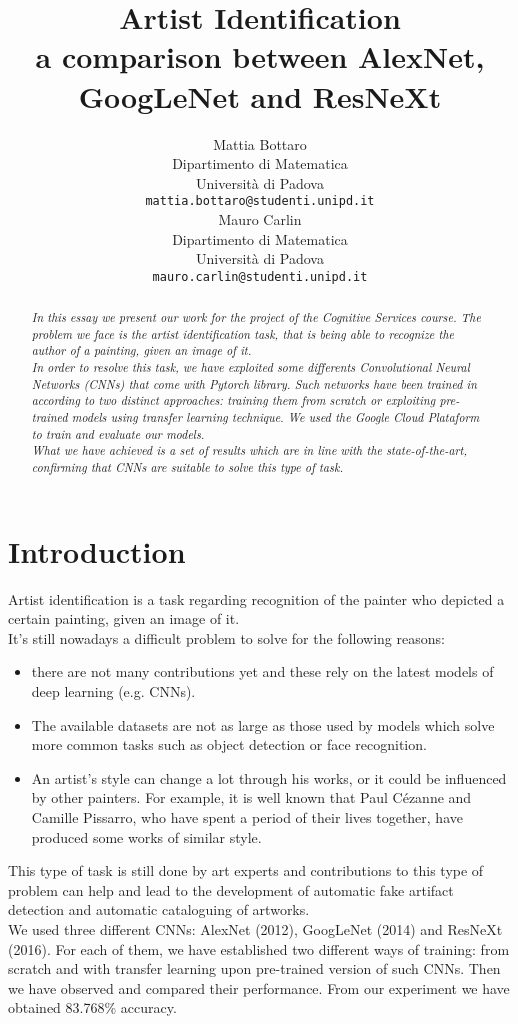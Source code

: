 \documentclass{article}
\title{Artist Identification	\\  a comparison between AlexNet, GoogLeNet and ResNeXt}
\author{
  Mattia Bottaro \\
  Dipartimento  di Matematica\\
  Università di Padova \\
  \texttt{mattia.bottaro@studenti.unipd.it} \\
   \And
  Mauro Carlin \\
Dipartimento  di Matematica\\
Università di Padova \\
\texttt{mauro.carlin@studenti.unipd.it} \\
}
\begin{document}
\maketitle

\begin{abstract}
	\textit{In this essay we present our work for the project of the Cognitive Services course.
	The problem we face is the artist identification task, that is being able to recognize the author of a painting, given an image of it.\\
	In order to resolve this task, we have exploited some differents Convolutional Neural Networks (CNNs) that come with \textit{Pytorch} library. Such networks have been trained in according to two distinct approaches: training them from scratch or exploiting pre-trained models using transfer learning technique. We used the \textit{Google Cloud Plataform} to train and evaluate our models.\\
	What we have achieved is a set of results which are in line with the  state-of-the-art, confirming that CNNs are suitable to solve this type of task.}
\end{abstract}




\section{Introduction}
Artist identification is a task regarding recognition of the painter who depicted a certain painting, given an image of it.\\
It's still nowadays a difficult problem to solve for the following reasons:
\begin{itemize}
	\item there are not many contributions yet and these rely on the latest models of deep learning (e.g. CNNs). 
	\item The available datasets are not as large as those used by models which solve more common tasks such as object detection or face recognition.
	\item An artist's style can change a lot through his works, or it could be influenced by other painters. For example, it is well known that Paul Cézanne and Camille Pissarro, who have spent a period of their lives together, have produced some works of similar style.
\end{itemize}
This type of task is still done by art experts and contributions to this type of problem can help and lead to the development of automatic fake artifact detection and automatic cataloguing of artworks.\\
We used three different CNNs: AlexNet (2012), GoogLeNet (2014) and ResNeXt (2016). For each of them, we have established two different ways of training: from scratch and with transfer learning  upon pre-trained version of such CNNs. Then we have observed and compared their performance. From our experiment we have obtained 83.768\% accuracy.\\
\end{document}
